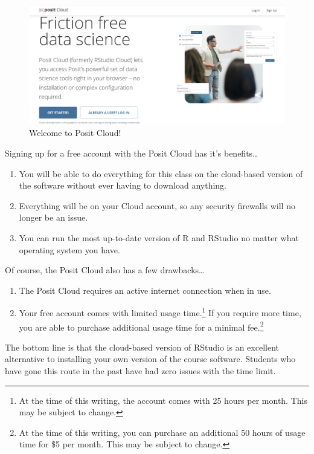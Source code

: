 \documentclass[
]{book}
\begin{document}
\begin{figure}

{\centering \includegraphics[width=0.75\linewidth]{images/RCloud} 

}

\caption{Welcome to Posit Cloud!}\label{fig:unnamed-chunk-28}
\end{figure}

Signing up for a free account with the Posit Cloud has it's benefits\ldots{}

\begin{enumerate}
\def\labelenumi{\arabic{enumi}.}
\item
  You will be able to do everything for this class on the cloud-based version of the software without ever having to download anything.
\item
  Everything will be on your Cloud account, so any security firewalls will no longer be an issue.
\item
  You can run the most up-to-date version of R and RStudio no matter what operating system you have.
\end{enumerate}

Of course, the Posit Cloud also has a few drawbacks\ldots{}

\begin{enumerate}
\def\labelenumi{\arabic{enumi}.}
\item
  The Posit Cloud requires an active internet connection when in use.
\item
  Your free account comes with limited usage time.\footnote{At the time of this writing, the account comes with 25 hours per month. This may be subject to change.} If you require more time, you are able to purchase additional usage time for a minimal fee.\footnote{At the time of this writing, you can purchase an additional 50 hours of usage time for \$5 per month. This may be subject to change.}
\end{enumerate}

The bottom line is that the cloud-based version of RStudio is an excellent alternative to installing your own version of the course software. Students who have gone this route in the past have had zero issues with the time limit.
\end{document}
